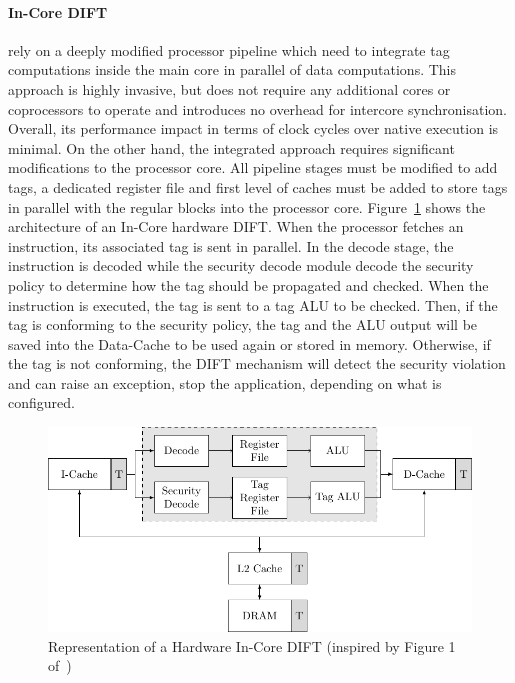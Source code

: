 \paragraph{In-Core DIFT} rely on a deeply modified processor pipeline which need to integrate tag computations inside the main core in parallel of data computations. This approach is highly invasive, but does not require any additional cores or coprocessors to operate and introduces no overhead for intercore synchronisation. Overall, its performance impact in terms of clock cycles over native execution is minimal. On the other hand, the integrated approach requires significant modifications to the processor core. All pipeline stages must be modified to add tags, a dedicated register file and first level of caches must be added to store tags in parallel with the regular blocks into the processor core. Figure~\ref{fig:incore_dift} shows the architecture of an In-Core hardware DIFT. When the processor fetches an instruction, its associated tag is sent in parallel. In the decode stage, the instruction is decoded while the security decode module decode the security policy to determine how the tag should be propagated and checked. When the instruction is executed, the tag is sent to a tag ALU to be checked. Then, if the tag is conforming to the security policy, the tag and the ALU output will be saved into the Data-Cache to be used again or stored in memory. Otherwise, if the tag is not conforming, the DIFT mechanism will detect the security violation and can raise an exception, stop the application, depending on what is configured.

\begin{figure}[ht]
    \centering
    \includegraphics{c2_soa/img/incore.pdf}
    \caption{Representation of a Hardware In-Core DIFT (inspired by Figure 1 of~\cite{KDK-09-dsn})}
    \label{fig:incore_dift}
\end{figure}

